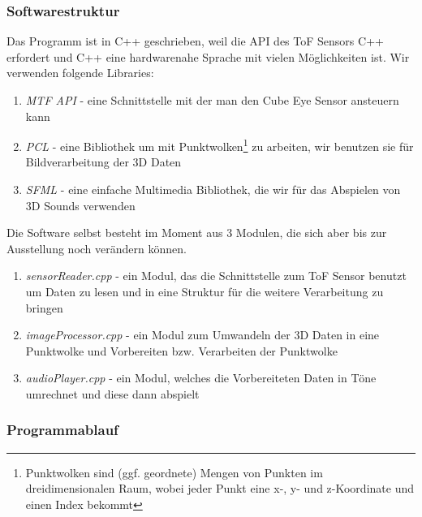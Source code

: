 \documentclass[a4paper,12pt,ngerman]{scrartcl}
\begin{document}
\subsubsection{Softwarestruktur}

Das Programm ist in C++ geschrieben, weil die API des ToF Sensors C++ erfordert und C++ eine hardwarenahe
Sprache mit vielen Möglichkeiten ist. Wir verwenden folgende Libraries:
\begin{enumerate}
	\item \textit{MTF API} - eine Schnittstelle mit der man den Cube Eye Sensor ansteuern kann
	\item \textit{PCL} - eine Bibliothek um mit Punktwolken\footnote{Punktwolken sind (ggf. geordnete) Mengen von Punkten im dreidimensionalen Raum, 
		wobei jeder Punkt eine x-, y- und z-Koordinate und einen Index bekommt} zu arbeiten, wir benutzen 
	sie für Bildverarbeitung der 3D Daten
	\item \textit{SFML} - eine einfache Multimedia Bibliothek, 
	die wir für das Abspielen von 3D Sounds verwenden 
\end{enumerate} 
Die Software selbst besteht im Moment aus 3 Modulen, die sich aber bis zur Ausstellung noch verändern 
können.
\begin{enumerate}
	\item \textit{sensorReader.cpp} - ein Modul, das die Schnittstelle zum ToF Sensor benutzt um Daten zu 
	lesen und in eine Struktur für die weitere Verarbeitung zu bringen
	\item \textit{imageProcessor.cpp} - ein Modul zum Umwandeln der 3D Daten in eine Punktwolke und 
	Vorbereiten bzw. Verarbeiten der Punktwolke
	\item \textit{audioPlayer.cpp} - ein Modul, welches die Vorbereiteten Daten in Töne umrechnet und 
	diese dann abspielt
\end{enumerate}

\subsubsection{Programmablauf}
\end{document}
